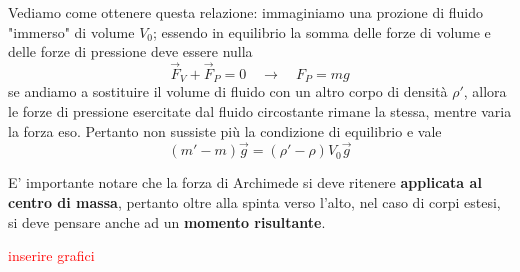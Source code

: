 \documentclass[x11names]{report}
\def\tick#1#2{\draw[thick] (#1)++(#2:0.1) --++ (#2-180:0.2)}
\newcommand{\vbF}{\vb{F}}
\begin{document}
	
	
	Vediamo come ottenere questa relazione: immaginiamo una prozione di fluido "immerso" di volume \(V_{0}\); essendo in equilibrio la somma delle forze di volume e delle forze di pressione deve essere nulla
	\[ 
	\overrightarrow{F}_{V} + \overrightarrow{F}_{P} = 0 \quad \to \quad F_{P} = mg
	\]
	se andiamo a sostituire il volume di fluido con un altro corpo di densità \(\rho'\), allora le forze di pressione esercitate dal fluido circostante rimane la stessa, mentre varia la forza eso. Pertanto non sussiste più la condizione di equilibrio e vale
	\[ 
	(m' - m)\vec{g} = (\rho'-\rho)V_{0}\vec{g}
	\]
	
	\begin{center}
	\end{center}
	
	E' importante notare che la forza di Archimede si deve ritenere \textbf{applicata al centro di massa}, pertanto oltre alla spinta verso l'alto, nel caso di corpi estesi, si deve pensare anche ad un \textbf{momento risultante}.
	\begin{center}
		\textcolor{red}{inserire grafici}
	\end{center}
	
\end{document}
